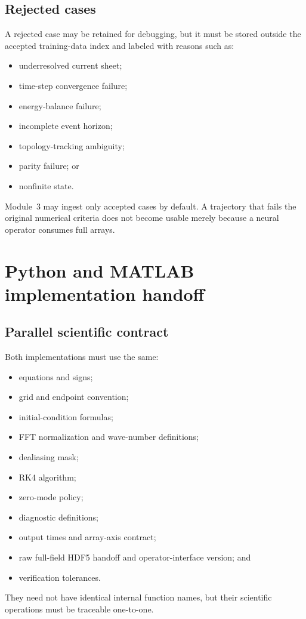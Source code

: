 \documentclass[11pt]{article}
\begin{document}
\subsection{Rejected cases}

A rejected case may be retained for debugging, but it must be stored outside the accepted training-data index and labeled with reasons such as:
\begin{itemize}
  \item underresolved current sheet;
  \item time-step convergence failure;
  \item energy-balance failure;
  \item incomplete event horizon;
  \item topology-tracking ambiguity;
  \item parity failure; or
  \item nonfinite state.
\end{itemize}
Module~3 may ingest only accepted cases by default. A trajectory that fails the original numerical criteria does not become usable merely because a neural operator consumes full arrays.

\section{Python and MATLAB implementation handoff}
\label{sec:contract}

\subsection{Parallel scientific contract}

Both implementations must use the same:
\begin{itemize}
  \item equations and signs;
  \item grid and endpoint convention;
  \item initial-condition formulas;
  \item FFT normalization and wave-number definitions;
  \item dealiasing mask;
  \item RK4 algorithm;
  \item zero-mode policy;
  \item diagnostic definitions;
  \item output times and array-axis contract;
  \item raw full-field HDF5 handoff and operator-interface version; and
  \item verification tolerances.
\end{itemize}
They need not have identical internal function names, but their scientific operations must be traceable one-to-one.
\end{document}
